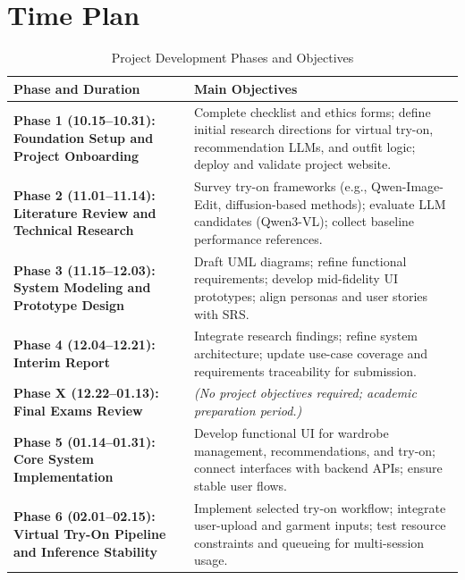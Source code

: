 \chapter{Time Plan}
\label{ch:timeline}

\begin{table}[H]
\small
\setlength{\tabcolsep}{8pt}
\renewcommand{\arraystretch}{1.5}
\centering
\caption{Project Development Phases and Objectives}
\label{tab:project_phases}
\begin{tabularx}{\textwidth}{@{}p{} X@{}}
\toprule
\textbf{Phase and Duration} & \textbf{Main Objectives} \\
\midrule

\textbf{Phase 1 (10.15--10.31): Foundation Setup and Project Onboarding} &
Complete checklist and ethics forms; define initial research directions for virtual try-on, recommendation LLMs, and outfit logic; deploy and validate project website. \\

\textbf{Phase 2 (11.01--11.14): Literature Review and Technical Research} &
Survey try-on frameworks (e.g., Qwen-Image-Edit, diffusion-based methods); evaluate LLM candidates (Qwen3-VL); collect baseline performance references. \\

\textbf{Phase 3 (11.15--12.03): System Modeling and Prototype Design} &
Draft UML diagrams; refine functional requirements; develop mid-fidelity UI prototypes; align personas and user stories with SRS. \\

\textbf{Phase 4 (12.04--12.21): Interim Report} &
Integrate research findings; refine system architecture; update use-case coverage and requirements traceability for submission. \\

\textbf{Phase X (12.22--01.13): Final Exams Review} &
\textit{(No project objectives required; academic preparation period.)} \\

\textbf{Phase 5 (01.14--01.31): Core System Implementation} &
Develop functional UI for wardrobe management, recommendations, and try-on; connect interfaces with backend APIs; ensure stable user flows. \\

\textbf{Phase 6 (02.01--02.15): Virtual Try-On Pipeline and Inference Stability} &
Implement selected try-on workflow; integrate user-upload and garment inputs; test resource constraints and queueing for multi-session usage. \\


\end{tabularx}
\end{table}

